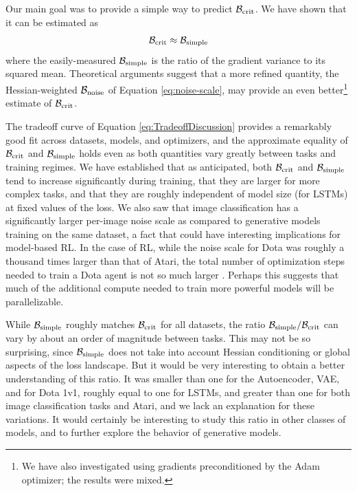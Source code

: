 \documentclass[english]{article}
\newcommand{\CB}{{\cal B}}
\begin{document}
Our  main goal was to provide a simple way to predict $\CB_{\rm crit}$.  We have shown that it can be estimated as
\begin{eqnarray}
\mathcal{B}_{{\rm crit}}\approx\mathcal{B}_{{\rm simple}}
\end{eqnarray}
where the easily-measured $\mathcal{B}_{{\rm simple}}$ is the ratio of the gradient variance to its squared mean. Theoretical arguments suggest that a more refined quantity, the Hessian-weighted $\CB_{{\rm noise}}$ of Equation \ref{eq:noise-scale}, may provide an even better\footnote{We have also investigated using gradients preconditioned by the Adam optimizer; the results were mixed.} estimate of $\CB_{{\rm crit}}$.

The tradeoff curve of Equation \ref{eq:TradeoffDiscussion} provides a remarkably good fit across datasets, models, and optimizers, and the approximate equality of  $\CB_{{\rm crit}}$ and $\CB_{{\rm simple}}$ holds even as both quantities vary greatly between tasks and training regimes. We have established that as anticipated, both $\CB_{{\rm crit}}$ and $\CB_{{\rm simple}}$ tend to increase significantly during training, that they are larger for more complex tasks, and that they are roughly independent of model size (for LSTMs) at fixed values of the loss. We also saw that image classification has a significantly larger per-image noise scale as compared to generative models training on the same dataset, a fact that could have interesting implications for model-based RL.  In the case of RL, while the noise scale for Dota was roughly a thousand times larger than that of Atari, the total number of optimization steps needed to train a Dota agent is not so much larger \cite{OpenAI_Five}.  Perhaps this suggests that much of the additional compute needed to train more powerful models will be parallelizable.

While $\CB_{{\rm simple}}$ roughly matches $\CB_{{\rm crit}}$ for all datasets, the ratio $\CB_{{\rm simple}}/\CB_{{\rm crit}}$ can vary by about an order of magnitude between tasks. This may not be so surprising, since $\CB_{{\rm simple}}$ does not take into account Hessian conditioning or global aspects of the loss landscape. But it would be very interesting to obtain a better understanding of this ratio. It was smaller than one for the Autoencoder, VAE, and for Dota 1v1, roughly equal to one for LSTMs, and greater than one for both image classification tasks and Atari, and we lack an explanation for these variations.  It would certainly be interesting to study this ratio in other classes of models, and to further explore the behavior of generative models.
\end{document}

